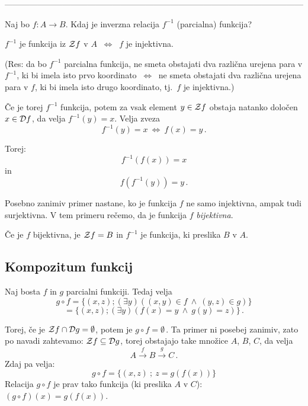 \documentclass[11pt,paper=b5,footinclude,headinclude]{scrbook} %
\def\inn {{~\wedge~}}
\def\cee {{~\Leftrightarrow~}}
\begin{document}
\bigskip

------------------------------------------------------------------------------------------------------------

\bigskip

Naj bo $f:A\to B$. Kdaj je inverzna relacija $f^{-1}$ (parcialna) funkcija?

\medskip
$f^{-1}$ je funkcija iz ${\cal Z}f$ v $A$ $\cee$ $f$ je injektivna.

(Res: da bo $f^{-1}$ parcialna funkcija, ne smeta obstajati dva različna urejena para v $f^{-1}$, ki bi imela isto prvo koordinato $\cee$ ne smeta obstajati dva različna urejena para v $f$, ki bi imela isto drugo koordinato, tj.~$f$ je injektivna.)



Če je torej $f^{-1}$ funkcija, potem za vsak element $y\in {\cal Z}f$  obstaja natanko določen $x\in {\cal D}f$, da velja
$f^{-1}(y) = x$. Velja zveza
$$f^{-1}(y) = x\cee f(x) = y\,.$$

Torej: $$f^{-1}(f(x)) = x$$
in
$$f(f^{-1}(y)) = y\,.$$

Posebno zanimiv primer nastane, ko je funkcija $f$ ne samo injektivna, ampak tudi surjektivna. V tem primeru rečemo, da je funkcija $f$ {\em bijektivna}.

Če je $f$ bijektivna, je ${\cal Z}f = B$ in $f^{-1}$ je funkcija, ki preslika $B$ v $A$.


%

\subsection{Kompozitum funkcij}

Naj bosta $f$ in $g$ parcialni funkciji. Tedaj velja
$$g\circ f = \{(x,z);(\exists y)((x,y)\in f\inn (y,z)\in g)\}$$
$$= \{(x,z);(\exists y)(f(x) = y \inn g(y) = z)\}\,.$$

Torej, če je ${\cal Z}f\cap {\cal D}g = \emptyset$, potem je $g\circ f = \emptyset\,.$ Ta primer ni posebej zanimiv, zato po navadi zahtevamo: ${\cal Z}f\subseteq {\cal D}g$, torej obstajajo take množice $A$, $B$, $C$, da velja $$A\overset{f}{\to} B\overset{g}{\to} C\,.$$ Zdaj pa velja:
$$g\circ f = \{(x,z)~;~z = g(f(x))\}$$
Relacija $g\circ f$ je prav tako funkcija (ki preslika $A$ v $C$): $(g\circ f)(x) = g(f(x))$.
\end{document}
